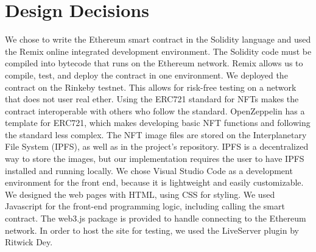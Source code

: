 \documentclass{article}
\begin{document}
\section{Design Decisions}
    We chose to write the Ethereum smart contract in the Solidity language and used the Remix online integrated development environment.
    The Solidity code must be compiled into bytecode that runs on the Ethereum network.
    Remix allows us to compile, test, and deploy the contract in one environment.
    We deployed the contract on the Rinkeby testnet. This allows for risk-free testing on a network that does not user real ether.
    \newline
    \indent
    Using the ERC721 standard for NFTs makes the contract interoperable with others who follow the standard.
    OpenZeppelin has a template for ERC721, which makes developing basic NFT functions and following the standard less complex.
    \newline
    \indent
    The NFT image files are stored on the Interplanetary File System (IPFS), as well as in the project's repository.
    IPFS is a decentralized way to store the images, but our implementation requires the user to have IPFS installed and running locally.
    \newline
    \indent
    We chose Visual Studio Code as a development environment for the front end, 
    because it is lightweight and easily customizable.
    We designed the web pages with HTML, using CSS for styling. 
    We used Javascript for the front-end programming logic, including calling the smart contract.
    The web3.js package is provided to handle connecting to the Ethereum network.
    In order to host the site for testing, we used the LiveServer plugin by Ritwick Dey.
\end{document}
